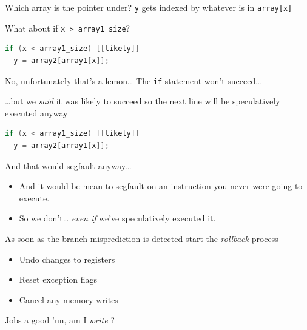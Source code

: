 \documentclass[9pt,aspectratio=169]{beamer}
\begin{document}
\begin{frame}[label={sec:orga73159a},fragile]{Which array is the pointer under?}
 \texttt{y} gets indexed by whatever is in \texttt{array[x]}

What about if \texttt{x > array1\_size}?
\begin{lstlisting}[language=C,numbers=none]
if (x < array1_size) [[likely]]
  y = array2[array1[x]];
\end{lstlisting}
\end{frame}

\begin{frame}[label={sec:org4ff5d11},fragile]{No, unfortunately that's a lemon\ldots{}}
 The \texttt{if} statement won't succeed\ldots{}

\ldots{}but we \emph{said} it was likely to succeed so the next line will be speculatively executed anyway

\begin{lstlisting}[language=C,numbers=none]
if (x < array1_size) [[likely]]
  y = array2[array1[x]];
\end{lstlisting}

And that would segfault anyway\ldots{}
\begin{itemize}
\item And it would be mean to segfault on an instruction you never were going to execute.
\item So we don't\ldots{} \emph{even if} we've speculatively executed it.
\end{itemize}

As soon as the branch misprediction is detected start the \emph{rollback} process
\begin{itemize}
\item Undo changes to registers
\item Reset exception flags
\item Cancel any memory writes
\end{itemize}

\begin{block}{Jobs a good 'un, am I \emph{write} ?}
\end{block}
\end{frame}
\end{document}
